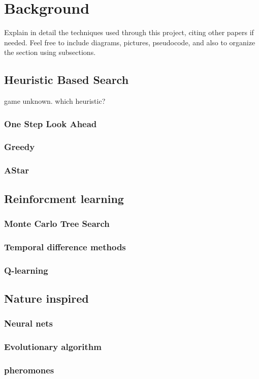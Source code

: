 

\section{Background} \label{sec:back}

Explain in detail the techniques used through this project, citing other papers if needed. Feel free to include diagrams, pictures, pseudocode, and also to organize the section using subsections.


\subsection{Heuristic Based Search} 

game unknown. which heuristic?
~\cite{DesurvireCT04}


\subsubsection{One Step Look Ahead}
\subsubsection{Greedy}
\subsubsection{AStar}





\subsection{Reinforcment learning} 
 

\subsubsection{Monte Carlo Tree Search} 
\subsubsection{Temporal difference methods} 
\subsubsection{Q-learning} 


\subsection{Nature inspired} 

\subsubsection{Neural nets} 
\subsubsection{Evolutionary algorithm} 
\subsubsection{pheromones} 







